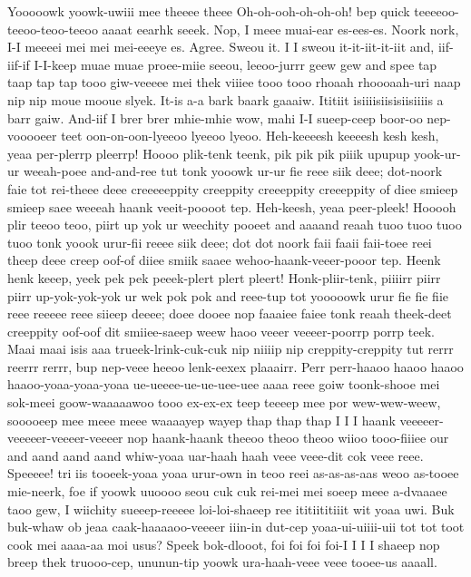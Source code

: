 \documentclass[12pt,a4paper]{article}
\begin{document}
\begin{drama}
\chorspeaks
Yooooowk yoowk-uwiii mee theeee theee  Oh-oh-ooh-oh-oh-oh! bep quick teeeeoo-teeoo-teoo-teeoo aaaat eearhk seeek.
\pistspeaks
Nop, I meee muai-ear es-ees-es. Noork nork, I-I meeeei mei mei mei-eeeye es.
\chorspeaks
Agree.
\pistspeaks
Sweou it.
\chorspeaks
I I sweou it-it-iit-it-iit and, iif-iif-if I-I-keep muae muae proee-miie seeou, leeoo-jurrr geew gew and spee tap taap tap tap tooo giw-veeeee mei thek viiiee tooo tooo rhoaah rhoooaah-uri naap nip nip moue mooue slyek.
\pistspeaks
It-is a-a bark baark gaaaiw. Ititiit isiiiisiisisiisiiiis a barr gaiw.
\chorspeaks
And-iif I brer brer mhie-mhie wow, mahi I-I sueep-ceep boor-oo nep-vooooeer teet oon-on-oon-lyeeoo lyeeoo lyeoo.
\heraspeaks
Heh-keeeesh keeeesh kesh kesh, yeaa per-plerrp pleerrp! Hoooo plik-tenk teenk, pik pik pik piiik upupup yook-ur-ur weeah-poee and-and-ree tut tonk yooowk ur-ur fie reee siik deee; dot-noork faie tot rei-theee deee creeeeeppity creeppity creeeppity creeeppity of diee smieep smieep saee weeeah haank veeit-poooot tep. Heh-keesh, yeaa peer-pleek! Hooooh plir teeoo teoo, piirt up yok ur weechity pooeet and aaaand reaah tuoo tuoo tuoo tuoo tonk yoook urur-fii reeee siik deee; dot dot noork faii faaii faii-toee reei theep deee creep oof-of diiee smiik saaee wehoo-haank-veeer-pooor tep. Heenk henk keeep, yeek pek pek peeek-plert plert pleert! Honk-pliir-tenk, piiiirr piirr piirr up-yok-yok-yok ur wek pok pok and reee-tup tot yooooowk urur fie fie fiie reee reeeee reee siieep deeee; doee dooee nop faaaiee faiee tonk reaah theek-deet creeppity oof-oof dit smiiee-saeep weew haoo veeer veeeer-poorrp porrp teek.
\chorspeaks
Maai maai isis aaa trueek-lrink-cuk-cuk nip niiiip nip creppity-creppity tut rerrr reerrr rerrr, bup nep-veee heeoo lenk-eexex plaaairr. Perr perr-haaoo haaoo haaoo haaoo-yoaa-yoaa-yoaa ue-ueeee-ue-ue-uee-uee aaaa reee goiw toonk-shooe mei sok-meei goow-waaaaawoo tooo ex-ex-ex teep teeeep mee por wew-wew-weew, sooooeep mee meee meee waaaayep wayep thap thap thap I I I haank veeeeer-veeeeer-veeeer-veeeer nop haank-haank theeoo theoo theoo wiioo tooo-fiiiee our and aand aand aand whiw-yoaa uar-haah haah veee veee-dit cok veee reee. Speeeee! tri iis tooeek-yoaa yoaa urur-own in teoo reei as-as-as-aas weoo as-tooee mie-neerk, foe if yoowk uuoooo seou cuk cuk rei-mei mei soeep meee a-dvaaaee taoo gew, I wiichity sueeep-reeeee loi-loi-shaeep ree ititiititiiit wit yoaa uwi. Buk buk-whaw ob jeaa caak-haaaaoo-veeeer iiin-in dut-cep yoaa-ui-uiiii-uii tot tot toot cook mei aaaa-aa moi usus? Speek bok-dlooot, foi foi foi foi-I I I I shaeep nop breep thek truooo-cep, ununun-tip yoowk ura-haah-veee veee tooee-us aaaall.

\end{drama}
\end{document}

